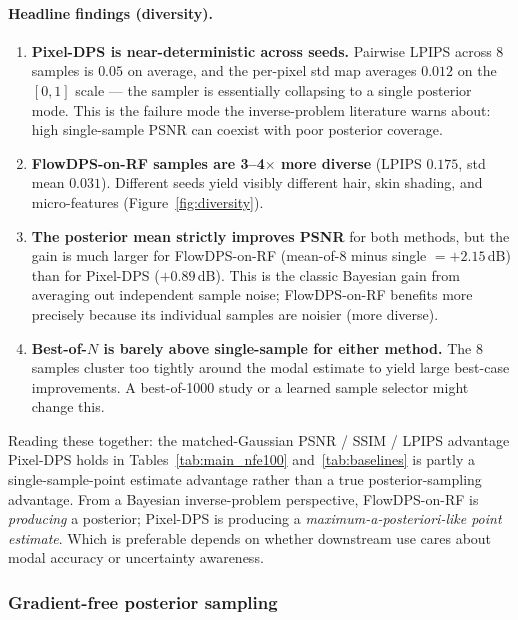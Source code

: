\documentclass{article}
\begin{document}
\paragraph{Headline findings (diversity).}
\begin{enumerate}[leftmargin=*,itemsep=2pt]
  \item \textbf{Pixel-DPS is near-deterministic across seeds.} Pairwise
    LPIPS across 8 samples is $0.05$ on average, and the per-pixel std
    map averages $0.012$ on the $[0, 1]$ scale --- the sampler is
    essentially collapsing to a single posterior mode. This is the
    failure mode the inverse-problem literature warns about: high
    single-sample PSNR can coexist with poor posterior coverage.
  \item \textbf{FlowDPS-on-RF samples are 3--4$\times$ more diverse}
    (LPIPS $0.175$, std mean $0.031$). Different seeds yield visibly
    different hair, skin shading, and micro-features (Figure~\ref{fig:diversity}).
  \item \textbf{The posterior mean strictly improves PSNR} for both
    methods, but the gain is much larger for FlowDPS-on-RF (mean-of-8
    minus single $= {+}2.15$\,dB) than for Pixel-DPS ($+0.89$\,dB).
    This is the classic Bayesian gain from averaging out independent
    sample noise; FlowDPS-on-RF benefits more precisely because its
    individual samples are noisier (more diverse).
  \item \textbf{Best-of-$N$ is barely above single-sample for either
    method.} The 8 samples cluster too tightly around the modal
    estimate to yield large best-case improvements. A best-of-1000
    study or a learned sample selector might change this.
\end{enumerate}

Reading these together: the matched-Gaussian PSNR / SSIM / LPIPS
advantage Pixel-DPS holds in Tables~\ref{tab:main_nfe100}
and~\ref{tab:baselines} is partly a single-sample-point estimate
advantage rather than a true posterior-sampling advantage. From a
Bayesian inverse-problem perspective, FlowDPS-on-RF is
\emph{producing} a posterior; Pixel-DPS is producing a
\emph{maximum-a-posteriori-like point estimate}. Which is preferable
depends on whether downstream use cares about modal accuracy or
uncertainty awareness.

\subsubsection{Gradient-free posterior sampling}\label{sec:gradfree}
\end{document}
